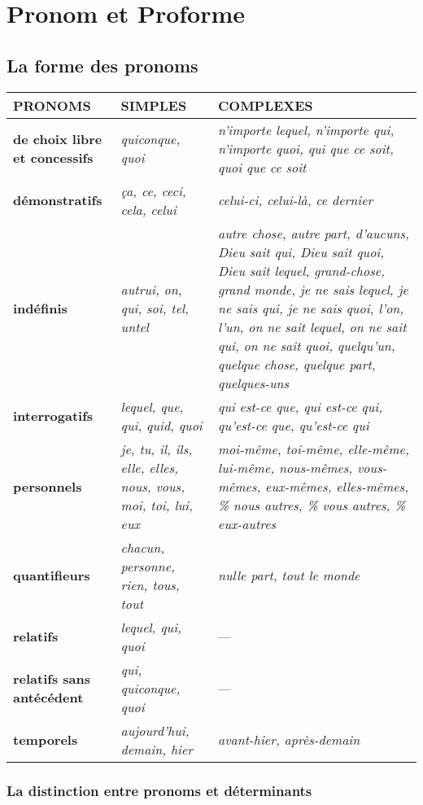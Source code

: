 \documentclass[UTF8]{report}
\begin{document}
\section{Pronom et Proforme}
\subsection{La forme des pronoms}
\begin{longtable}{|>{\raggedright\arraybackslash}p{4cm}|>{\raggedright\arraybackslash}p{5cm}|>{\raggedright\arraybackslash}p{6cm}|}
\hline
\rowcolor{cyan!20}
\textbf{PRONOMS} & \textbf{SIMPLES} & \textbf{COMPLEXES} \\
\hline
\textbf{de choix libre et concessifs} & \textit{quiconque, quoi} & \textit{n’importe lequel, n’importe qui, n’importe quoi, qui que ce soit, quoi que ce soit} \\
\hline
\textbf{démonstratifs} & \textit{ça, ce, ceci, cela, celui} & \textit{celui-ci, celui-là, ce dernier} \\
\hline
\textbf{indéfinis} & \textit{autrui, on, qui, soi, tel, untel} & 
\textit{autre chose, autre part, d’aucuns, Dieu sait qui, Dieu sait quoi, Dieu sait lequel, grand-chose, grand monde, je ne sais lequel, je ne sais qui, je ne sais quoi, l’on, l’un, on ne sait lequel, on ne sait qui, on ne sait quoi, quelqu’un, quelque chose, quelque part, quelques-uns} \\
\hline
\textbf{interrogatifs} & \textit{lequel, que, qui, quid, quoi} & \textit{qui est-ce que, qui est-ce qui, qu’est-ce que, qu’est-ce qui} \\
\hline
\textbf{personnels} & \textit{je, tu, il, ils, elle, elles, nous, vous, moi, toi, lui, eux} & 
\textit{moi-même, toi-même, elle-même, lui-même, nous-mêmes, vous-mêmes, eux-mêmes, elles-mêmes, \% nous autres, \% vous autres, \% eux-autres} \\
\hline
\textbf{quantifieurs} & \textit{chacun, personne, rien, tous, tout} & \textit{nulle part, tout le monde} \\
\hline
\textbf{relatifs} & \textit{lequel, qui, quoi} & — \\
\hline
\textbf{relatifs sans antécédent} & \textit{qui, quiconque, quoi} & — \\
\hline
\textbf{temporels} & \textit{aujourd’hui, demain, hier} & \textit{avant-hier, après-demain} \\
\hline
\end{longtable}

\subsubsection{La distinction entre pronoms et déterminants}
\end{document}
